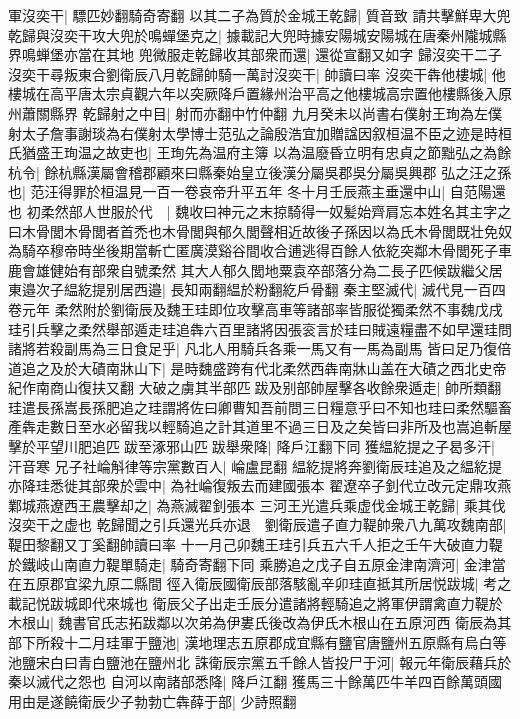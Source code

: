 軍沒奕干|{
	驃匹妙翻騎奇寄翻}
以其二子為質於金城王乾歸|{
	質音致}
請共擊鮮卑大兜乾歸與沒奕干攻大兜於鳴蟬堡克之|{
	據載記大兜時據安陽城安陽城在唐秦州隴城縣界鳴蝉堡亦當在其地}
兜微服走乾歸收其部衆而還|{
	還從宣翻又如字}
歸沒奕干二子沒奕干尋叛東合劉衛辰八月乾歸帥騎一萬討沒奕干|{
	帥讀曰率}
沒奕干犇他樓城|{
	他樓城在高平唐太宗貞觀六年以突厥降戶置緣州治平高之他樓城高宗置他樓縣後入原州蕭關縣界}
乾歸射之中目|{
	射而亦翻中竹仲翻}
九月癸未以尚書右僕射王珣為左僕射太子詹事謝琰為右僕射太學博士范弘之論殷浩宜加贈諡因叙桓温不臣之迹是時桓氏猶盛王珣温之故吏也|{
	王珣先為温府主簿}
以為温廢昏立明有忠貞之節黜弘之為餘杭令|{
	餘杭縣漢屬會稽郡顧來曰縣秦始皇立後漢分屬吳郡吳分屬吳興郡}
弘之汪之孫也|{
	范汪得罪於桓温見一百一卷哀帝升平五年}
冬十月壬辰燕主垂還中山|{
	自范陽還也}
初柔然部人世服於代　|{
	魏收曰神元之末掠騎得一奴髪始齊肩忘本姓名其主字之曰木骨閭木骨閭者首禿也木骨閭與郁久閭聲相近故後子孫因以為氏木骨閭既壮免奴為騎卒穆帝時坐後期當斬亡匿廣漠谿谷間收合逋逃得百餘人依紇突鄰木骨閭死子車鹿會雄健始有部衆自號柔然}
其大人郁久閭地粟袁卒部落分為二長子匹候跋繼父居東邉次子緼紇提别居西邉|{
	長知兩翻緼於粉翻紇戶骨翻}
秦主堅滅代|{
	滅代見一百四卷元年}
柔然附於劉衛辰及魏王珪即位攻擊高車等諸部率皆服從獨柔然不事魏戊戌珪引兵擊之柔然舉部遁走珪追犇六百里諸將因張衮言於珪曰賊遠糧盡不如早還珪問諸將若殺副馬為三日食足乎|{
	凡北人用騎兵各乘一馬又有一馬為副馬}
皆曰足乃復倍道追之及於大磧南牀山下|{
	是時魏盛跨有代北柔然西犇南牀山盖在大磧之西北史帝紀作南商山復扶又翻}
大破之虜其半部匹跋及别部帥屋擊各收餘衆遁走|{
	帥所類翻}
珪遣長孫嵩長孫肥追之珪謂將佐曰卿曹知吾前問三日糧意乎曰不知也珪曰柔然驅畜產犇走數日至水必留我以輕騎追之計其道里不過三日及之矣皆曰非所及也嵩追斬屋擊於平望川肥追匹跋至涿邪山匹跋舉衆降|{
	降戶江翻下同}
獲緼紇提之子曷多汗|{
	汗音寒}
兄子社崘斛律等宗黨數百人|{
	崘盧昆翻}
緼紇提將奔劉衛辰珪追及之緼紇提亦降珪悉徙其部衆於雲中|{
	為社崘復叛去而建國張本}
翟遼卒子釗代立改元定鼎攻燕鄴城燕遼西王農擊却之|{
	為燕滅翟釗張本}
三河王光遣兵乘虚伐金城王乾歸|{
	乘其伐沒奕干之虚也}
乾歸聞之引兵還光兵亦退　劉衛辰遣子直力鞮帥衆八九萬攻魏南部|{
	鞮田黎翻又丁奚翻帥讀曰率}
十一月己卯魏王珪引兵五六千人拒之壬午大破直力鞮於鐵岐山南直力鞮單騎走|{
	騎奇寄翻下同}
乘勝追之戊子自五原金津南濟河|{
	金津當在五原郡宜梁九原二縣間}
徑入衛辰國衛辰部落駭亂辛卯珪直抵其所居悦跋城|{
	考之載記悦跋城即代來城也}
衛辰父子出走壬辰分遣諸將輕騎追之將軍伊謂禽直力鞮於木根山|{
	魏書官氏志拓跋鄰以次弟為伊婁氏後改為伊氏木根山在五原河西}
衛辰為其部下所殺十二月珪軍于鹽池|{
	漢地理志五原郡成宜縣有鹽官唐鹽州五原縣有烏白等池鹽宋白曰青白鹽池在鹽州北}
誅衛辰宗黨五千餘人皆投尸于河|{
	報元年衛辰藉兵於秦以滅代之怨也}
自河以南諸部悉降|{
	降戶江翻}
獲馬三十餘萬匹牛羊四百餘萬頭國用由是遂饒衛辰少子勃勃亡犇薛于部|{
	少詩照翻}
